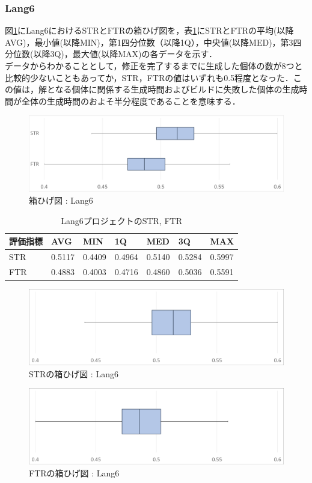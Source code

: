 \documentclass[uplatex,dvipdfmx,a4paper]{jsarticle}
\begin{document}
\subsubsection{Lang6}
図\ref{fig:Lang6_boxplot}にLang6におけるSTRとFTRの箱ひげ図を，表\ref{tab:Lang6}にSTRとFTRの平均(以降AVG)，最小値(以降MIN)，第1四分位数（以降1Q），中央値(以降MED)，第3四分位数(以降3Q)，最大値(以降MAX)の各データを示す．\\
データからわかることとして，修正を完了するまでに生成した個体の数が8つと比較的少ないこともあってか，STR，FTRの値はいずれも0.5程度となった．この値は，解となる個体に関係する生成時間およびビルドに失敗した個体の生成時間が全体の生成時間のおよそ半分程度であることを意味する．
\begin{figure}[t]
  \centering
  \includegraphics[width=\linewidth]{fig/Lang6_boxplot.png}
  \caption{箱ひげ図 : Lang6}
  \label{fig:Lang6_boxplot}
\end{figure}
\begin{table}[b]
  \centering
  \caption{Lang6プロジェクトのSTR, FTR}
  \label{tab:Lang6}
  \begin{tabular}{l|llllll} \hline\hline
    評価指標 & AVG         & MIN & 1Q & MED & 3Q & MAX   \\\hline
    STR & 0.5117 & 0.4409 & 0.4964 & 0.5140 & 0.5284 & 0.5997  \\
    FTR & 0.4883 & 0.4003 & 0.4716 & 0.4860 & 0.5036 & 0.5591 \\\hline\hline
  \end{tabular}
\end{table}
\begin{figure}[t]
  \centering
  \includegraphics[width=\linewidth]{fig/Lang6_boxplot_STR.png}
  \caption{STRの箱ひげ図 : Lang6}
  \label{fig:Lang6_boxplot_STR}
\end{figure}
\begin{figure}[t]
  \centering
  \includegraphics[width=\linewidth]{fig/Lang6_boxplot_FTR.png}
  \caption{FTRの箱ひげ図 : Lang6}
  \label{fig:Lang6_boxplot_FTR}
\end{figure}
\end{document}
